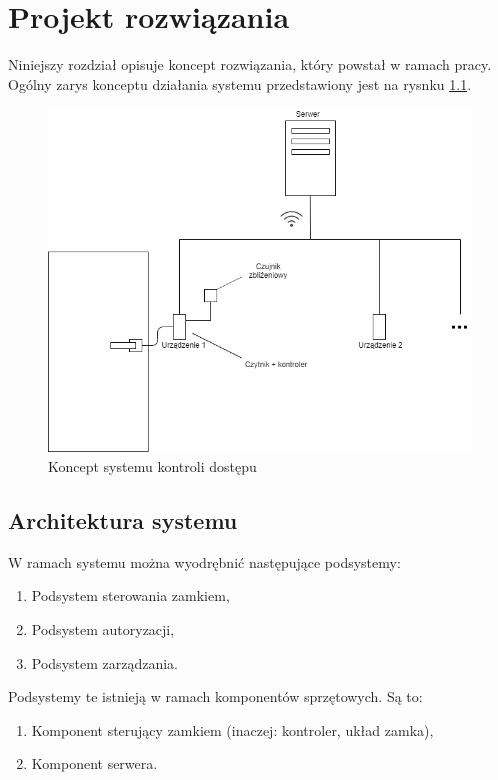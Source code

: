 \chapter{Projekt rozwiązania}
\label{chap:hl-arch}

        Niniejszy rozdział opisuje koncept rozwiązania, który powstał w ramach pracy. Ogólny zarys konceptu działania systemu przedstawiony jest na rysnku \ref{fig:door}.

        \begin{figure}[]
                \includegraphics[width=\linewidth]{chapters/images/door2.png}
                \caption{Koncept systemu kontroli dostępu}
                \label{fig:door}
        \end{figure}

        \section{Architektura systemu}
                W ramach systemu można wyodrębnić następujące podsystemy:
                \begin{enumerate}
                        \item Podsystem sterowania zamkiem,
                        \item Podsystem autoryzacji,
                        \item Podsystem zarządzania.
                \end{enumerate}

                Podsystemy te istnieją w ramach komponentów sprzętowych. Są to:
                \begin{enumerate}
                        \item Komponent sterujący zamkiem (inaczej: kontroler, układ zamka),
                        \item Komponent serwera.
                \end{enumerate}

